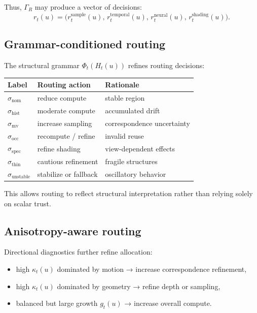 \documentclass[11pt,letterpaper]{article}
\theoremstyle{gcresult}
\theoremstyle{definition}
\begin{document}
Thus, $\Gamma_R$ may produce a vector of decisions:
\begin{equation}
r_t(u)=\bigl(r^{\mathrm{sample}}_t(u),\,r^{\mathrm{temporal}}_t(u),\,r^{\mathrm{neural}}_t(u),\,r^{\mathrm{shading}}_t(u)\bigr).
\end{equation}


\subsection{Grammar-conditioned routing}

The structural grammar $\Phi_t(H_t(u))$ refines routing decisions:

\begin{center}
\begin{tabular}{lll}
\toprule
Label & Routing action & Rationale \\
\midrule
$\sigma_{\mathrm{nom}}$ & reduce compute & stable region \\
$\sigma_{\mathrm{hist}}$ & moderate compute & accumulated drift \\
$\sigma_{\mathrm{mv}}$ & increase sampling & correspondence uncertainty \\
$\sigma_{\mathrm{occ}}$ & recompute / refine & invalid reuse \\
$\sigma_{\mathrm{spec}}$ & refine shading & view-dependent effects \\
$\sigma_{\mathrm{thin}}$ & cautious refinement & fragile structures \\
$\sigma_{\mathrm{unstable}}$ & stabilize or fallback & oscillatory behavior \\
\bottomrule
\end{tabular}
\end{center}

This allows routing to reflect structural interpretation rather than relying solely on scalar trust.


\subsection{Anisotropy-aware routing}

Directional diagnostics further refine allocation:
\begin{itemize}[leftmargin=1.5em]
    \item high $\kappa_t(u)$ dominated by motion → increase correspondence refinement,
    \item high $\kappa_t(u)$ dominated by geometry → refine depth or sampling,
    \item balanced but large growth $g_t(u)$ → increase overall compute.
\end{itemize}
\end{document}
